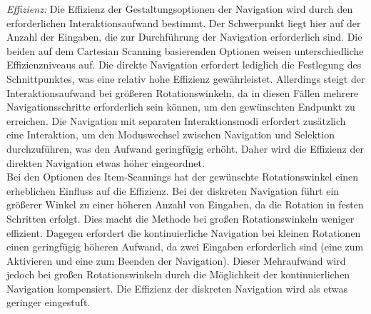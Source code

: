 \textit{Effizienz:}
Die Effizienz der Gestaltungsoptionen der Navigation wird durch den erforderlichen Interaktionsaufwand bestimmt. Der Schwerpunkt liegt hier auf der Anzahl der Eingaben, die zur Durchführung der Navigation erforderlich sind. Die beiden auf dem Cartesian Scanning basierenden Optionen weisen unterschiedliche Effizienzniveaus auf. Die direkte Navigation erfordert lediglich die Festlegung des Schnittpunktes, was eine relativ hohe Effizienz gewährleistet. Allerdings steigt der Interaktionsaufwand bei größeren Rotationswinkeln, da in diesen Fällen mehrere Navigationsschritte erforderlich sein können, um den gewünschten Endpunkt zu erreichen. Die Navigation mit separaten Interaktionsmodi erfordert zusätzlich eine Interaktion, um den Moduswechsel zwischen Navigation und Selektion durchzuführen, was den Aufwand geringfügig erhöht. Daher wird die Effizienz der direkten Navigation etwas höher eingeordnet. \\
Bei den Optionen des Item-Scannings hat der gewünschte Rotationswinkel einen erheblichen Einfluss auf die Effizienz. Bei der diskreten Navigation führt ein größerer Winkel zu einer höheren Anzahl von Eingaben, da die Rotation in festen Schritten erfolgt. Dies macht die Methode bei großen Rotationswinkeln weniger effizient. Dagegen erfordert die kontinuierliche Navigation bei kleinen Rotationen einen geringfügig höheren Aufwand, da zwei Eingaben erforderlich sind (eine zum Aktivieren und eine zum Beenden der Navigation). Dieser Mehraufwand wird jedoch bei großen Rotationswinkeln durch die Möglichkeit der kontinuierlichen Navigation kompensiert. Die Effizienz der diskreten Navigation wird als etwas geringer eingestuft.


